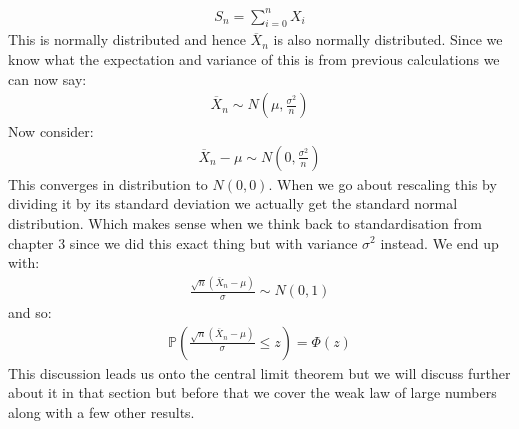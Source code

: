 \documentclass[,oneside]{article}
\begin{document}
\begin{enumerate}
\begin{align*}
S_n = \sum_{i=0}^{n}X_i
\end{align*} 
This is normally distributed and hence $\overline{X}_n$ is also normally distributed. Since we know what the expectation and variance of this is from previous calculations we can now say:
\begin{align*}
\overline{X}_n \sim N \left (\mu, \frac{\sigma^2}{n} \right )
\end{align*} 
Now consider:
\begin{align*}
\overline{X}_n - \mu \sim N  \left (0, \frac{\sigma^2}{n} \right )
\end{align*}
This converges in distribution to $N(0,0)$. When we go about rescaling this by dividing it by its standard deviation we actually get the standard normal distribution. Which makes sense when we think back to standardisation from chapter 3 since we did this exact thing but with variance $\sigma^2$ instead. We end up with:
\begin{align*}
\frac{\sqrt{n}\left ( \overline{X}_n - \mu \right )}{\sigma} \sim N(0,1)
\end{align*}
and so:
\begin{align*}
\mathbb{P} \left ( \frac{\sqrt{n}\left ( \overline{X}_n - \mu \right )}{\sigma}  \leq z\right ) = \Phi (z)
\end{align*}
This discussion leads us onto the central limit theorem but we will discuss further about it in that section but before that we cover the weak law of large numbers along with a few other results.

\end{enumerate}
\end{document}
